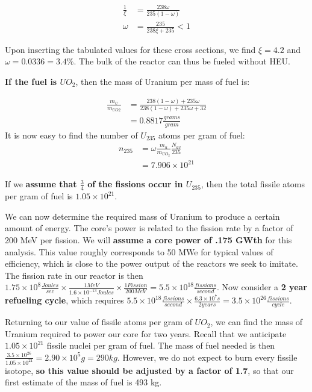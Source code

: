 \documentclass[12pt]{article}
\begin{document}
\begin{align}
\frac{1}{\xi} &= \frac{238 \omega}{235 (1 - \omega)} \\
\omega &= \frac{235}{238 \xi + 235} < 1
\end{align} 

Upon inserting the tabulated values for these cross sections, we find $\xi = 4.2$ and $\omega = 0.0336 = 3.4 \% $. The bulk of the reactor can thus be fueled without HEU.

\textbf{If the fuel is $UO_2$}, then the mass of Uranium per mass of fuel is:

\begin{align}
\frac{m_U}{m_{UO2}} &= \frac{238 (1 - \omega) + 235 \omega}{238 (1 - \omega) + 235 \omega + 32} \\
 &= 0.8817 \frac{grams}{gram}
\end{align}
It is now easy to find the number of $U_{235}$ atoms per gram of fuel:
\begin{align}
n_{235} &= \omega \frac{m_u}{m_{UO_2}} \frac{N_{av}}{235} \\
 &= 7.906 \times 10^{21}
\end{align}

If we \textbf{assume that $\frac{3}{4}$ of the fissions occur in $U_{235}$}, then the total fissile atoms per gram of fuel is $1.05 \times 10^{21}$. 

We can now determine the required mass of Uranium to produce a certain amount of energy. The core's power is related to the fission rate by a factor of 200 MeV per fission. We will \textbf{assume a core power of .175 GWth} for this analysis. This value roughly corresponds to 50 MWe for typical values of efficiency, which is close to the power output of the reactors we seek to imitate. The fission rate in our reactor is then $1.75 \times 10^8 \frac{Joules}{sec} \times \frac{1 MeV}{1.6 \times 10^{-13} Joules} \times \frac{1 Fission}{200 MeV} = 5.5 \times 10^{18} \frac{fissions}{second}$. Now consider a \textbf{2 year refueling cycle}, which requires $5.5 \times 10^{18} \frac{fissions}{second} \times \frac{6.3 \times 10^7 s}{2 years} = 3.5 \times 10^{26} \frac{fissions}{cycle}$.

Returning to our value of fissile atoms per gram of $UO_2$, we can find the mass of Uranium required to power our core for two years. Recall that we anticipate $1.05 \times 10^{21}$ fissile nuclei per gram of fuel. The mass of fuel needed is then $\frac{3.5 \times 10 ^{26}}{1.05 \times 10^{21}} = 2.90 \times 10^{5} g = 290 kg$. However, we do not expect to burn every fissile isotope, \textbf{so this value should be adjusted by a factor of 1.7}, so that our first estimate of the mass of fuel is 493 kg. 
\end{document}
